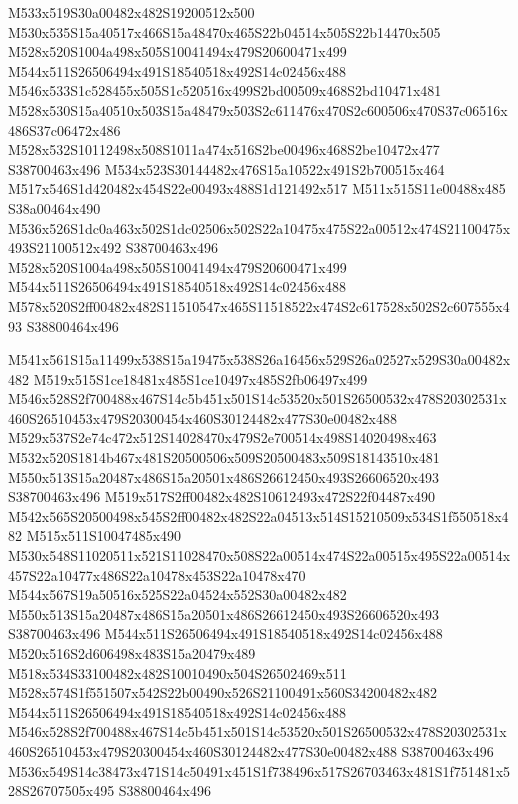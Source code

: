 \documentclass{article}
\begin{document}
\begin{multicols}{2}





M533x519S30a00482x482S19200512x500 M530x535S15a40517x466S15a48470x465S22b04514x505S22b14470x505 M528x520S1004a498x505S10041494x479S20600471x499 M544x511S26506494x491S18540518x492S14c02456x488 M546x533S1c528455x505S1c520516x499S2bd00509x468S2bd10471x481 M528x530S15a40510x503S15a48479x503S2c611476x470S2c600506x470S37c06516x486S37c06472x486 M528x532S10112498x508S1011a474x516S2be00496x468S2be10472x477 S38700463x496 M534x523S30144482x476S15a10522x491S2b700515x464 M517x546S1d420482x454S22e00493x488S1d121492x517 M511x515S11e00488x485 S38a00464x490 M536x526S1dc0a463x502S1dc02506x502S22a10475x475S22a00512x474S21100475x493S21100512x492 S38700463x496 M528x520S1004a498x505S10041494x479S20600471x499 M544x511S26506494x491S18540518x492S14c02456x488 M578x520S2ff00482x482S11510547x465S11518522x474S2c617528x502S2c607555x493 S38800464x496

M541x561S15a11499x538S15a19475x538S26a16456x529S26a02527x529S30a00482x482 M519x515S1ce18481x485S1ce10497x485S2fb06497x499 M546x528S2f700488x467S14c5b451x501S14c53520x501S26500532x478S20302531x460S26510453x479S20300454x460S30124482x477S30e00482x488 M529x537S2e74c472x512S14028470x479S2e700514x498S14020498x463 M532x520S1814b467x481S20500506x509S20500483x509S18143510x481 M550x513S15a20487x486S15a20501x486S26612450x493S26606520x493 S38700463x496 M519x517S2ff00482x482S10612493x472S22f04487x490 M542x565S20500498x545S2ff00482x482S22a04513x514S15210509x534S1f550518x482 M515x511S10047485x490 M530x548S11020511x521S11028470x508S22a00514x474S22a00515x495S22a00514x457S22a10477x486S22a10478x453S22a10478x470 M544x567S19a50516x525S22a04524x552S30a00482x482 M550x513S15a20487x486S15a20501x486S26612450x493S26606520x493 S38700463x496 M544x511S26506494x491S18540518x492S14c02456x488 M520x516S2d606498x483S15a20479x489 M518x534S33100482x482S10010490x504S26502469x511 M528x574S1f551507x542S22b00490x526S21100491x560S34200482x482 M544x511S26506494x491S18540518x492S14c02456x488 M546x528S2f700488x467S14c5b451x501S14c53520x501S26500532x478S20302531x460S26510453x479S20300454x460S30124482x477S30e00482x488 S38700463x496 M536x549S14c38473x471S14c50491x451S1f738496x517S26703463x481S1f751481x528S26707505x495 S38800464x496


\end{multicols}
\end{document}
